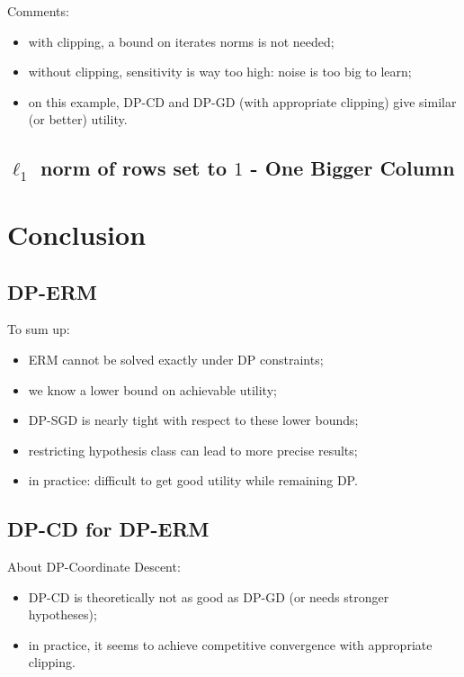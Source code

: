 \documentclass[notheorems]{beamer}
\begin{document}
\begin{frame}
  Comments:
  \begin{itemize}
  \item with clipping, a bound on iterates norms is not needed;
  \item without clipping, sensitivity is way too high: noise is too big to learn;
  \item on this example, DP-CD and DP-GD (with appropriate clipping) give similar (or better) utility.
  \end{itemize}
\end{frame}

\subsection{$\ell_1$ norm of rows set to $1$ - One Bigger Column}
\label{sub:l1_norm_of_rows_set_to1}


\section{Conclusion}
\label{sec:conclusion}

\subsection{DP-ERM}
\label{sub:dp_erm}

\begin{frame}
  To sum up:
  \begin{itemize}
  \item ERM cannot be solved exactly under DP constraints;
  \item we know a lower bound on achievable utility;
  \item DP-SGD is nearly tight with respect to these lower bounds;
  \item restricting hypothesis class can lead to more precise results;
  \item in practice: difficult to get good utility while remaining DP.
  \end{itemize}
\end{frame}

\subsection{DP-CD for DP-ERM}
\label{sub:dp_cd_for_dp_erm}

\begin{frame}
  About DP-Coordinate Descent:
  \begin{itemize}
  \item DP-CD is theoretically not as good as DP-GD (or needs stronger hypotheses);
  \item in practice, it seems to achieve competitive convergence with appropriate clipping.
  \end{itemize}
\end{frame}
\end{document}
